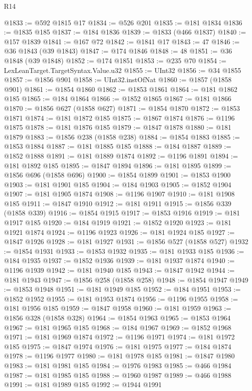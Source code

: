 \begin{lexlean}{R14}
\begin{coremodule}
@1833 := @592 @1815 @17
@1834 := @526 @201
@1835 := @181 @1834
@1836 := @1835 @185
@1837 := @184 @1836
@1839 := @1833 (@466 @1837)
@1840 := @157 @1839
@1841 := @167 @72
@1842 := @1841 @17
@1843 := 47
@1846 := @36 @1843 (@39 @1843)
@1847 := @174 @1846
@1848 := 48
@1851 := @36 @1848 (@39 @1848)
@1852 := @174 @1851
@1853 := @235 @70
@1854 := LexLeanTarget.TargetSyntax.Value.u32
@1855 := UInt32
@1856 := @34 @1855
@1857 := @1856 @901
@1858 := UInt32.instOfNat
@1860 := @1857 (@1858 @901)
@1861 := @1854 @1860
@1862 := @1853 @1861
@1864 := @181 @1862 @185
@1865 := @184 @1864
@1866 := @1852 @1865
@1867 := @181 @1866
@1870 := @1856 @627 (@1858 @627)
@1871 := @1854 @1870
@1872 := @1853 @1871
@1874 := @181 @1872 @185
@1875 := @1867 @1874
@1876 := @1196 @1875
@1878 := @181 @1876 @185
@1879 := @1847 @1878
@1880 := @181 @1879
@1883 := @1856 @238 (@1858 @238)
@1884 := @1854 @1883
@1885 := @1853 @1884
@1887 := @181 @1885 @185
@1888 := @184 @1887
@1889 := @1852 @1888
@1891 := @181 @1889 @1874
@1892 := @1196 @1891
@1894 := @181 @1892 @185
@1895 := @1847 @1894
@1896 := @181 @1895
@1899 := @1856 @696 (@1858 @696)
@1900 := @1854 @1899
@1901 := @1853 @1900
@1903 := @181 @1901 @185
@1904 := @184 @1903
@1905 := @1852 @1904
@1907 := @181 @1905 @1874
@1908 := @1196 @1907
@1910 := @181 @1908 @185
@1911 := @1847 @1910
@1912 := @181 @1911
@1915 := @1856 @339 (@1858 @339)
@1916 := @1854 @1915
@1917 := @1853 @1916
@1919 := @181 @1917 @185
@1920 := @184 @1919
@1921 := @1852 @1920
@1923 := @181 @1921 @1874
@1924 := @1196 @1923
@1926 := @181 @1924 @185
@1927 := @1847 @1926
@1928 := @181 @1927
@1931 := @1856 @527 (@1858 @527)
@1932 := @1854 @1931
@1933 := @1853 @1932
@1935 := @181 @1933 @185
@1936 := @184 @1935
@1937 := @1852 @1936
@1939 := @181 @1937 @1874
@1940 := @1196 @1939
@1942 := @181 @1940 @185
@1943 := @1847 @1942
@1944 := @181 @1943
@1947 := @1856 @258 (@1858 @258)
@1948 := @1854 @1947
@1949 := @1853 @1948
@1951 := @181 @1949 @185
@1952 := @184 @1951
@1953 := @1852 @1952
@1955 := @181 @1953 @1874
@1956 := @1196 @1955
@1958 := @181 @1956 @185
@1959 := @1847 @1958
@1960 := @181 @1959
@1963 := @1856 @328 (@1858 @328)
@1964 := @1854 @1963
@1965 := @1853 @1964
@1967 := @181 @1965 @185
@1968 := @184 @1967
@1969 := @1852 @1968
@1971 := @181 @1969 @1874
@1972 := @1196 @1971
@1974 := @181 @1972 @185
@1975 := @1847 @1974
@1976 := @181 @1975
@1977 := @184 @1874
@1978 := @1196 @1977
@1980 := @181 @1978 @185
@1981 := @1847 @1980
@1983 := @181 @1981 @185
@1984 := @1976 @1983
@1985 := @466 @1984
@1987 := @181 @1985 @185
@1988 := @1960 @1987
@1989 := @466 @1988
@1991 := @181 @1989 @185
@1992 := @1944 @1991

\end{coremodule}
\end{lexlean}
